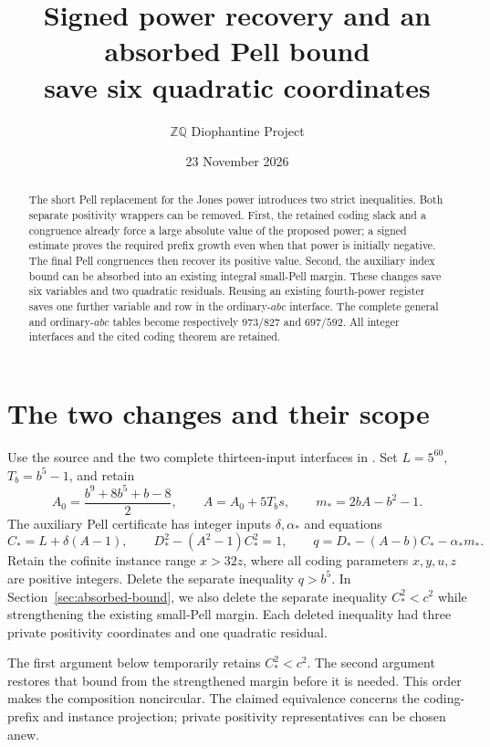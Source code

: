 \documentclass[11pt]{article}
\title{Signed power recovery and an absorbed Pell bound\\save six quadratic coordinates}
\author{\(\mathbb Z\mathbb Q\) Diophantine Project}
\date{23 November 2026}
\begin{document}
\maketitle

\begin{abstract}
The short Pell replacement for the Jones power introduces two strict
inequalities. Both separate positivity wrappers can be removed.
First, the retained coding slack and a congruence already force a large
absolute value of the proposed power; a signed estimate proves the
required prefix growth even when that power is initially negative.
The final Pell congruences then recover its positive value. Second,
the auxiliary index bound can be absorbed into an existing integral
small-Pell margin. These changes save six variables and two quadratic
residuals. Reusing an existing fourth-power register saves one further
variable and row in the ordinary-\(abc\) interface. The complete
general and ordinary-\(abc\) tables become respectively \(973/827\)
and \(697/592\). All integer interfaces and the cited coding theorem
are retained.
\end{abstract}

\section{The two changes and their scope}

Use the source and the two complete thirteen-input interfaces in
\cite{Power}. Set \(L=5^{60}\), \(T_b=b^5-1\), and retain
\[
 A_0=\frac{b^9+8b^5+b-8}{2},\qquad A=A_0+5T_bs,
 \qquad m_*=2bA-b^2-1.
\]
The auxiliary Pell certificate has integer inputs \(\delta,\alpha_*\)
and equations
\[
 C_*=L+\delta(A-1),\qquad
 D_*^2-(A^2-1)C_*^2=1,\qquad
 q=D_*-(A-b)C_*-\alpha_*m_*.
\]
Retain the cofinite instance range \(x>32z\), where all coding
parameters \(x,y,u,z\) are positive integers. Delete the separate
inequality \(q>b^5\). In Section~\ref{sec:absorbed-bound}, we also
delete the separate inequality \(C_*^2<c^2\) while strengthening
the existing small-Pell margin. Each deleted inequality had three
private positivity coordinates and one quadratic residual.

The first argument below temporarily retains \(C_*^2<c^2\).
The second argument restores that bound from the strengthened margin
before it is needed. This order makes the composition noncircular.
The claimed equivalence concerns the coding-prefix and instance
projection; private positivity representatives can be chosen anew.
\end{document}
